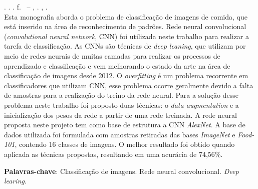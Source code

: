 
\begin{resumo}[RESUMO]
\begin{SingleSpacing}

\imprimirautorcitacao. \imprimirtitulo. \imprimirdata. \pageref {LastPage} f. \imprimirprojeto\ – \imprimirprograma, \imprimirinstituicao. \imprimirlocal, \imprimirdata.\\


Esta monografia aborda o problema de classificação de imagens de comida, que está inserido na área de reconhecimento de padrões. Rede neural convolucional (\textit{convolutional neural network}, CNN) foi utilizada neste trabalho para realizar a tarefa de classificação. As CNNs são técnicas de \textit{deep leaning}, que utilizam por meio de redes neurais de muitas camadas para realizar os processos de aprendizado e classificação e vem melhorando o estado da arte na área de classificação de imagens desde 2012. O \textit{overfitting} é um problema recorrente em classificadores que utilizam CNN, esse problema ocorre geralmente devido a falta de amostras para a realização do treino da rede neural. Para a solução desse problema neste trabalho foi proposto duas técnicas: o \textit{data augmentation} e a inicialização dos pesos da rede a partir de uma rede treinada. A rede neural proposta neste projeto tem como base de estrutura a CNN \textit{AlexNet}. A base de dados utilizada foi formulada com amostras retiradas das bases \textit{ImageNet} e \textit{Food-101}, contendo 16 classes de imagens. O melhor resultado foi obtido quando aplicada as técnicas propostas, resultando em uma acurácia de 74,56\%.

\textbf{Palavras-chave}: Classificação de imagens. Rede neural convolucional. \textit{Deep learing}.

\end{SingleSpacing}
\end{resumo}


